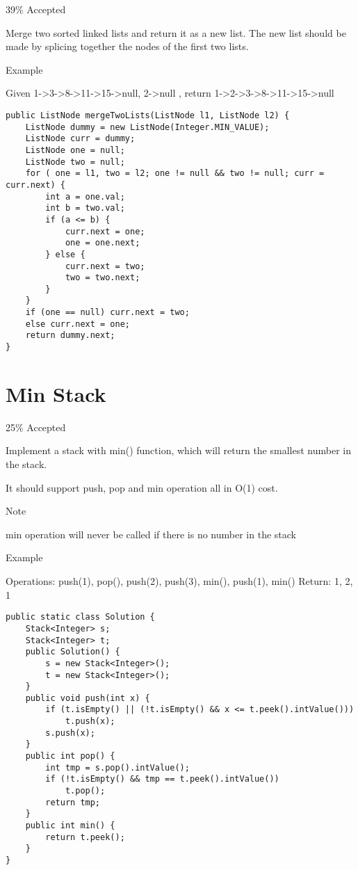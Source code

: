 \documentclass[12pt]{book}
\begin{document}
39\% Accepted

Merge two sorted linked lists and return it as a new list. The new list should be made by splicing together the nodes of the first two lists.

Example

Given 1->3->8->11->15->null, 2->null , return 1->2->3->8->11->15->null
\lstset{language=java,label= ,caption= ,numbers=none}
\begin{lstlisting}
public ListNode mergeTwoLists(ListNode l1, ListNode l2) {
    ListNode dummy = new ListNode(Integer.MIN_VALUE);
    ListNode curr = dummy;
    ListNode one = null;
    ListNode two = null;
    for ( one = l1, two = l2; one != null && two != null; curr = curr.next) {
        int a = one.val;
        int b = two.val;
        if (a <= b) {
            curr.next = one;
            one = one.next;
        } else {
            curr.next = two;
            two = two.next;
        }
    }
    if (one == null) curr.next = two;
    else curr.next = one;
    return dummy.next;
}
\end{lstlisting}
\chapter{Min Stack}
\label{sec-44}

25\% Accepted

Implement a stack with min() function, which will return the smallest number in the stack.

It should support push, pop and min operation all in O(1) cost.

Note

min operation will never be called if there is no number in the stack

Example

Operations: push(1), pop(), push(2), push(3), min(), push(1), min()
Return: 1, 2, 1
\lstset{language=java,label= ,caption= ,numbers=none}
\begin{lstlisting}
public static class Solution {
    Stack<Integer> s;
    Stack<Integer> t;
    public Solution() {
        s = new Stack<Integer>();
        t = new Stack<Integer>();
    }
    public void push(int x) {
        if (t.isEmpty() || (!t.isEmpty() && x <= t.peek().intValue()))
            t.push(x);
        s.push(x);
    }
    public int pop() {
        int tmp = s.pop().intValue();
        if (!t.isEmpty() && tmp == t.peek().intValue())
            t.pop();
        return tmp;
    }
    public int min() {
        return t.peek();
    }
}
\end{lstlisting}
\end{document}
